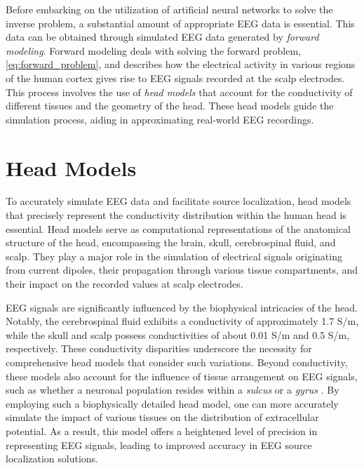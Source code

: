 \documentclass[a4paper, UKenglish, 11pt]{uiomaster}
\begin{document}

Before embarking on the utilization of artificial neural networks to solve the inverse problem, a substantial amount of appropriate EEG data is essential. This data can be obtained through simulated EEG data generated by \emph{forward modeling}. Forward modeling deals with solving the forward problem, \ref{eq:forward_problem}, and describes how the electrical activity in various regions of the human cortex gives rise to EEG signals recorded at the scalp electrodes. This process involves the use of \emph{head models} that account for the conductivity of different tissues and the geometry of the head. These head models guide the simulation process, aiding in approximating real-world EEG recordings. 


\section{Head Models}
To accurately simulate EEG data and facilitate source localization, head models that precisely represent the conductivity distribution within the human head is essential. Head models serve as computational representations of the anatomical structure of the head, encompassing the brain, skull, cerebrospinal fluid, and scalp. They play a major role in the simulation of electrical signals originating from current dipoles, their propagation through various tissue compartments, and their impact on the recorded values at scalp electrodes.


EEG signals are significantly influenced by the biophysical intricacies of the head. Notably, the cerebrospinal fluid exhibits a conductivity of approximately 1.7 S/m, while the skull and scalp possess conductivities of about 0.01 S/m and 0.5 S/m, respectively. These conductivity disparities underscore the necessity for comprehensive head models that consider such variations. Beyond conductivity, these models also account for the influence of tissue arrangement on EEG signals, such as whether a neuronal population resides within a \emph{sulcus} or a \emph{gyrus} \cite{naess2021biophysically}. By employing such a biophysically detailed head model, one can more accurately simulate the impact of various tissues on the distribution of extracellular potential. As a result, this model offers a heightened level of precision in representing EEG signals, leading to improved accuracy in EEG source localization solutions.
\end{document}
